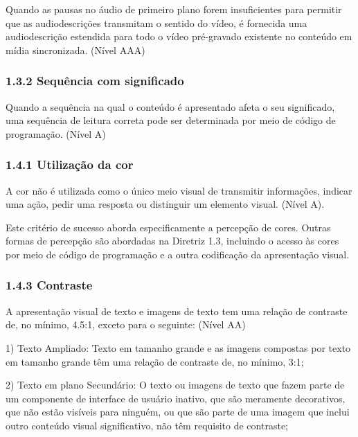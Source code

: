 \documentclass[a4paper]{article}
\begin{document}
\begin{titlepage}
Quando as pausas no áudio de primeiro plano forem insuficientes para permitir que as audiodescrições transmitam o sentido do vídeo, é fornecida uma audiodescrição estendida para todo o vídeo pré-gravado existente no conteúdo em mídia sincronizada. (Nível AAA)

\subsubsection{1.3.2 Sequência com significado}

Quando a sequência na qual o conteúdo é apresentado afeta o seu significado, uma sequência de leitura correta pode ser determinada por meio de código de programação. (Nível A)

\subsubsection{1.4.1 Utilização da cor}

A cor não é utilizada como o único meio visual de transmitir informações, indicar uma ação, pedir uma resposta ou distinguir um elemento visual. (Nível A). 

Este critério de sucesso aborda especificamente a percepção de cores. Outras formas de percepção são abordadas na Diretriz 1.3, incluindo o acesso às cores por meio de código de programação e a outra codificação da apresentação visual.

\subsubsection{1.4.3 Contraste}

A apresentação visual de texto e imagens de texto tem uma relação de contraste de, no mínimo, 4.5:1, exceto para o seguinte: (Nível AA)\\

\hspace{.1\textwidth} %
\begin{minipage}{.85\textwidth}
	1) Texto Ampliado: Texto em tamanho grande e as imagens compostas por texto em tamanho grande têm uma relação de contraste de, no mínimo, 3:1;\\
\end{minipage}

\hspace{.1\textwidth} %
\begin{minipage}{.85\textwidth}
	2) Texto em plano Secundário: O texto ou imagens de texto que fazem parte de um componente de interface de usuário inativo, que são meramente decorativos, que não estão visíveis para ninguém, ou que são parte de uma imagem que inclui outro conteúdo visual significativo, não têm requisito de contraste;\\
\end{minipage}


\end{titlepage}
\end{document}
